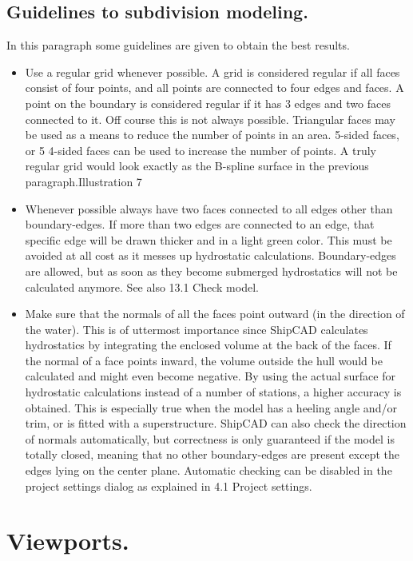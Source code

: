 \documentclass[12pt]{article}
\begin{document}
\subsection{Guidelines to subdivision modeling.}
In this paragraph some guidelines are given to obtain the best
results.
\begin{itemize}
  \item Use a regular grid whenever possible. A
grid is considered regular if all faces consist
of four points, and all points are connected
to four edges and faces. A point on the
boundary is considered regular if it has 3
edges and two faces connected to it. Off
course this is not always possible.
Triangular faces may be used as a means
to reduce the number of points in an area.
5-sided faces, or 5 4-sided faces can be
used to increase the number of points. A
truly regular grid would look exactly as the
B-spline surface in the previous paragraph.Illustration 7

\item Whenever possible always have two faces
connected to all edges other than boundary-edges. If more than two edges are connected to
an edge, that specific edge will be drawn thicker and in a light green color. This must be
avoided at all cost as it messes up hydrostatic calculations. Boundary-edges are allowed,
but as soon as they become submerged hydrostatics will not be calculated anymore. See
also 13.1 Check model.

\item Make sure that the normals of all the faces point outward (in the direction of the water). This
is of uttermost importance since ShipCAD calculates hydrostatics by integrating the
enclosed volume at the back of the faces. If the normal of a face points inward, the volume
outside the hull would be calculated and might even become negative. By using the actual
surface for hydrostatic calculations instead of a number of stations, a higher accuracy is
obtained. This is especially true when the model has a heeling angle and/or trim, or is fitted
with a superstructure. ShipCAD can also check the direction of normals automatically, but
correctness is only guaranteed if the model is totally closed, meaning that no other
boundary-edges are present except the edges lying on the center plane. Automatic checking
can be disabled in the project settings dialog as explained in 4.1 Project settings.
\end{itemize}

\section{Viewports.}
\end{document}
